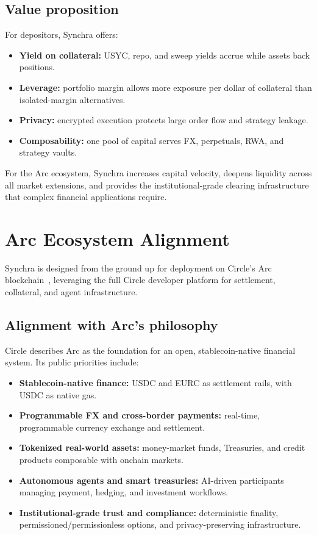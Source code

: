 \documentclass[11pt,a4paper]{article}
\begin{document}
\subsection{Value proposition}

For depositors, Synchra offers:
\begin{itemize}
  \item \textbf{Yield on collateral:} USYC, repo, and sweep yields accrue while assets back positions.
  \item \textbf{Leverage:} portfolio margin allows more exposure per dollar of collateral than isolated-margin alternatives.
  \item \textbf{Privacy:} encrypted execution protects large order flow and strategy leakage.
  \item \textbf{Composability:} one pool of capital serves FX, perpetuals, RWA, and strategy vaults.
\end{itemize}

For the Arc ecosystem, Synchra increases capital velocity, deepens liquidity across all market extensions, and provides the institutional-grade clearing infrastructure that complex financial applications require.

\section{Arc Ecosystem Alignment}
\label{sec:arc}

Synchra is designed from the ground up for deployment on Circle's Arc blockchain~\cite{circlearc}, leveraging the full Circle developer platform for settlement, collateral, and agent infrastructure.

\subsection{Alignment with Arc's philosophy}

Circle describes Arc as the foundation for an open, stablecoin-native financial system. Its public priorities include:
\begin{itemize}
  \item \textbf{Stablecoin-native finance:} USDC and EURC as settlement rails, with USDC as native gas.
  \item \textbf{Programmable FX and cross-border payments:} real-time, programmable currency exchange and settlement.
  \item \textbf{Tokenized real-world assets:} money-market funds, Treasuries, and credit products composable with onchain markets.
  \item \textbf{Autonomous agents and smart treasuries:} AI-driven participants managing payment, hedging, and investment workflows.
  \item \textbf{Institutional-grade trust and compliance:} deterministic finality, permissioned/permissionless options, and privacy-preserving infrastructure.
\end{itemize}
\end{document}
